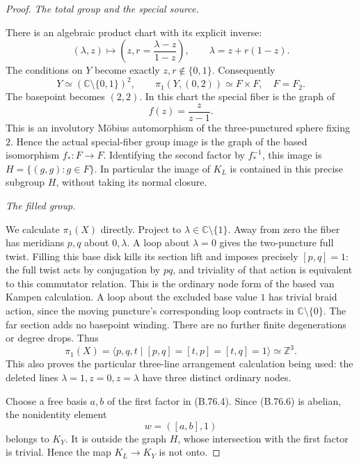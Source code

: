\begin{proof}
\emph{The total group and the special source.}\par
There is an algebraic product chart with its explicit inverse:
\[
 (\lambda,z)\longmapsto
       \left(z,r=\frac{\lambda-z}{1-z}\right),
 \qquad \lambda=z+r(1-z).
 \tag{B.76.3}
\]
The conditions on \(Y\) become exactly \(z,r\notin\{0,1\}\).
Consequently
\[
       Y\simeq(\mathbb C\setminus\{0,1\})^2,
       \qquad\pi_1(Y,(0,2))\simeq F\times F,
       \quad F=F_2.
 \tag{B.76.4}
\]
The basepoint becomes \((2,2)\). In this chart the special
fiber is the graph of
\[
                         f(z)=\frac{z}{z-1}.
 \tag{B.76.5}
\]
This is an involutory M\"obius automorphism of the three-punctured
sphere fixing \(2\). Hence the actual special-fiber group image is
the graph of the based isomorphism \(f_*:F\to F\).
Identifying the second factor by \(f_*^{-1}\), this image is
\(H=\{(g,g):g\in F\}\). In particular the image of \(K_L\)
is contained in this precise subgroup \(H\), without taking its
normal closure.

\emph{The filled group.}\par
We calculate \(\pi_1(X)\) directly. Project to
\(\lambda\in\mathbb C\setminus\{1\}\). Away from zero the
fiber has meridians \(p,q\) about \(0,\lambda\). A loop about
\(\lambda=0\) gives the two-puncture full twist. Filling this
base disk kills its section lift and imposes precisely
\([p,q]=1\): the full twist acts by conjugation by \(pq\),
and triviality of that action is equivalent to this commutator
relation. This is the ordinary node form of the based van Kampen
calculation. A loop about the excluded base value \(1\) has
trivial braid action, since the moving puncture's corresponding
loop contracts in \(\mathbb C\setminus\{0\}\). The far section
adds no basepoint winding. There are no further finite
degenerations or degree drops. Thus
\[
 \pi_1(X)=\langle p,q,t\mid
       [p,q]=[t,p]=[t,q]=1\rangle\simeq\mathbb Z^3.
 \tag{B.76.6}
\]
This also proves the particular three-line arrangement calculation
being used: the deleted lines \(\lambda=1,z=0,z=\lambda\)
have three distinct ordinary nodes.

Choose a free basis \(a,b\) of the first factor in (B.76.4).
Since (B.76.6) is abelian, the nonidentity element
\[
                              w=([a,b],1)
 \tag{B.76.7}
\]
belongs to \(K_Y\). It is outside the graph \(H\), whose
intersection with the first factor is trivial. Hence the map
\(K_L\to K_Y\) is not onto.


\end{proof}
